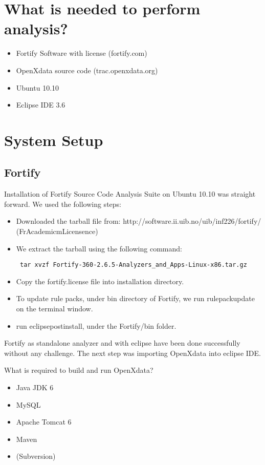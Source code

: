 \documentclass[11pt,a4paper]{article}
\theoremstyle{definition}
\begin{document}
\section{What is needed to perform analysis?}
\begin{itemize}
 \item Fortify Software with license (fortify.com)
 \item OpenXdata source code (trac.openxdata.org)
 \item Ubuntu 10.10
 \item Eclipse IDE 3.6
\end{itemize}

\section{System Setup}

\subsection{Fortify}

Installation of Fortify Source Code Analysis Suite on Ubuntu 10.10 was straight forward. We used the following steps:
\begin{itemize}
 \item Downloaded the tarball file from: http://software.ii.uib.no/uib/inf226/fortify/ (FrAcademicmLicensence)
 \item We extract the tarball using the following command:
 \begin{verbatim} tar xvzf Fortify-360-2.6.5-Analyzers_and_Apps-Linux-x86.tar.gz\end{verbatim}
 \item Copy the fortify.license file into installation directory.
 \item To update rule packs, under bin directory of Fortify, we run rulepackupdate on the terminal window.
 \item run eclipsepostinstall, under the Fortify/bin folder.
\end{itemize}

Fortify as standalone analyzer and with eclipse have been done successfully without any challenge.
The next step was importing OpenXdata into eclipse IDE.

What is required to build and run OpenXdata?
\begin{itemize}
 \item Java JDK 6
 \item MySQL
 \item Apache Tomcat 6
 \item Maven
 \item (Subversion)
\end{itemize}
\end{document}
